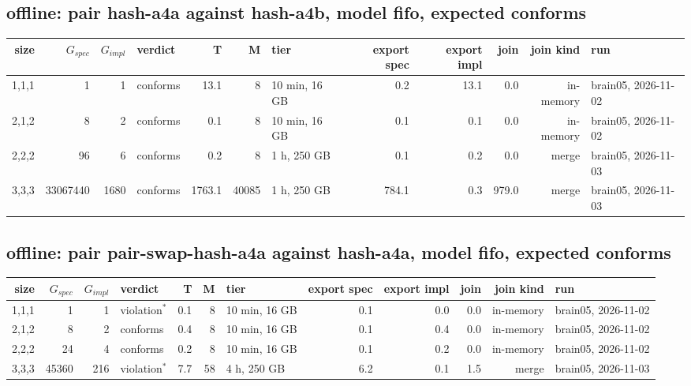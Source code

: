 \documentclass[10pt]{article}
\begin{document}
\subsection*{offline: pair \textsf{hash-a4a} against \textsf{hash-a4b}, model fifo, expected conforms}
\begin{longtable}{@{}rrrlrrlrrrrl@{}}
\toprule
size & $G_{\mathit{spec}}$ & $G_{\mathit{impl}}$ & verdict & T & M & tier & export spec & export impl & join & join kind & run \\
\midrule
\endhead
\color{red} 1,1,1 & 1 & 1 & conforms & 13.1 & 8 & 10 min, 16 GB & 0.2 & 13.1 & 0.0 & in-memory & brain05, 2026-11-02 \\
\color{red} 2,1,2 & 8 & 2 & conforms & 0.1 & 8 & 10 min, 16 GB & 0.1 & 0.1 & 0.0 & in-memory & brain05, 2026-11-02 \\
\color{blue} 2,2,2 & 96 & 6 & conforms & 0.2 & 8 & 1 h, 250 GB & 0.1 & 0.2 & 0.0 & merge & brain05, 2026-11-03 \\
\color{blue} 3,3,3 & 33067440 & 1680 & conforms & 1763.1 & 40085 & 1 h, 250 GB & 784.1 & 0.3 & 979.0 & merge & brain05, 2026-11-03 \\
\bottomrule
\end{longtable}
\subsection*{offline: pair \textsf{pair-swap-hash-a4a} against \textsf{hash-a4a}, model fifo, expected conforms}
\begin{longtable}{@{}rrrlrrlrrrrl@{}}
\toprule
size & $G_{\mathit{spec}}$ & $G_{\mathit{impl}}$ & verdict & T & M & tier & export spec & export impl & join & join kind & run \\
\midrule
\endhead
\color{red} 1,1,1 & 1 & 1 & violation$^{\ast}$ & 0.1 & 8 & 10 min, 16 GB & 0.1 & 0.0 & 0.0 & in-memory & brain05, 2026-11-02 \\
\color{red} 2,1,2 & 8 & 2 & conforms & 0.4 & 8 & 10 min, 16 GB & 0.1 & 0.4 & 0.0 & in-memory & brain05, 2026-11-02 \\
\color{red} 2,2,2 & 24 & 4 & conforms & 0.2 & 8 & 10 min, 16 GB & 0.1 & 0.2 & 0.0 & in-memory & brain05, 2026-11-02 \\
\color{blue} 3,3,3 & 45360 & 216 & violation$^{\ast}$ & 7.7 & 58 & 4 h, 250 GB & 6.2 & 0.1 & 1.5 & merge & brain05, 2026-11-03 \\
\bottomrule
\end{longtable}
\end{document}
